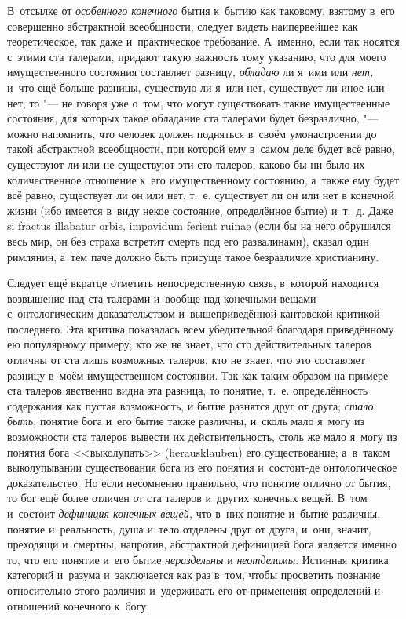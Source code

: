 В~отсылке от {\em особенного конечного} бытия к~бытию как таковому, взятому
в~его совершенно абстрактной всеобщности, следует видеть наипервейшее как
теоретическое, так даже и~практическое требование. А~именно, если так носятся
с~этими ста талерами, придают такую важность тому указанию, что для моего
имущественного состояния составляет разницу, {\em обладаю} ли я~ими или
{\em нет,} и~что ещё больше разницы, существую ли я~или нет, существует ли иное
или нет, то "--- не говоря уже о~том, что могут существовать такие
имущественные состояния, для которых такое обладание ста талерами будет
безразлично, "--- можно напомнить, что человек должен подняться в~своём
умонастроении до такой абстрактной всеобщности, при которой ему в~самом деле
будет всё равно, существуют ли или не существуют эти сто талеров, каково бы ни
было их количественное отношение к~его имущественному состоянию, а~также ему
будет всё равно, существует ли он или нет, т.~е. существует ли он или нет в
конечной жизни (ибо имеется в~виду некое состояние, определённое бытие) и~т.~д.
Даже si fractus illabatur orbis, impavidum ferient ruinae (если бы на него
обрушился весь мир, он без страха встретит смерть под его развалинами), сказал
один римлянин, а~тем паче должно быть присуще такое безразличие христианину.

Следует ещё вкратце отметить непосредственную связь, в~которой находится
возвышение над ста талерами и~вообще над конечными вещами с~онтологическим
доказательством и~вышеприведённой кантовской критикой последнего. Эта критика
показалась всем убедительной благодаря приведённому ею популярному примеру; кто
же не знает, что сто действительных талеров отличны от ста лишь возможных
талеров, кто не знает, что это составляет разницу в~моём имущественном
состоянии. Так как таким образом на примере ста талеров явственно видна эта
разница, то понятие, т.~е. определённость содержания как пустая возможность, и
бытие разнятся друг от друга; {\em стало быть,} понятие бога и~его бытие также
различны, и~сколь мало я~могу из возможности ста талеров вывести их
действительность, столь же мало я~могу из понятия бога <<выколупать>>
(heraus\-klau\-ben) его существование; а~в~таком выколупывании существования
бога из его понятия и~состоит-де онтологическое доказательство. Но если
несомненно правильно, что понятие отлично от бытия, то бог ещё более
отличен от ста талеров и~других конечных вещей. В~том и~состоит
{\em дефиниция конечных вещей,} что в~них понятие и~бытие различны, понятие
и~реальность, душа и~тело отделены друг от друга, и~они, значит, преходящи
и~смертны; напротив, абстрактной дефиницией бога является именно то, что его
понятие и~его бытие {\em нераздельны} и {\em неотделимы}. Истинная критика
категорий и~разума и~заключается как раз в~том, чтобы просветить познание
относительно этого различия и~удерживать его от применения определений и
отношений конечного к~богу.\label{bkm:bm85b}

